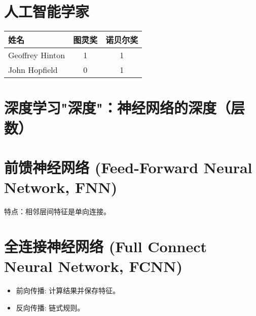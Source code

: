 \documentclass[
12pt, %
a4paper, 
oneside, %
headinclude,footinclude, %
]{scrartcl}
\title{\normalfont\spacedallcaps{深度学习}}
\date{}
\begin{document}
\maketitle
\newpage
\hypertarget{toc}{}
\begingroup
\begin{multicols}{2}
\tableofcontents
\end{multicols}
\endgroup
\newpage
\listoffigures
\listoftables
\listoftips
\newpage
\section{人工智能学家}
\begin{table}[h]
    \centering
    \begin{tabular}{|l|c|c|}
        \hline
        姓名 & 图灵奖 & 诺贝尔奖 \\
        \hline
        Geoffrey Hinton & 1 & 1 \\
        \hline
        John Hopfield & 0 & 1 \\
        \hline
    \end{tabular}
\end{table}

\section{深度学习"深度"：神经网络的深度（层数）}

\section{前馈神经网络 (Feed-Forward Neural Network, FNN)}
特点：相邻层间特征是单向连接。

\section{全连接神经网络 (Full Connect Neural Network, FCNN)}
\begin{itemize}
    \item 前向传播: 计算结果并保存特征。
    \item 反向传播: 链式规则。
\end{itemize}
\end{document}
